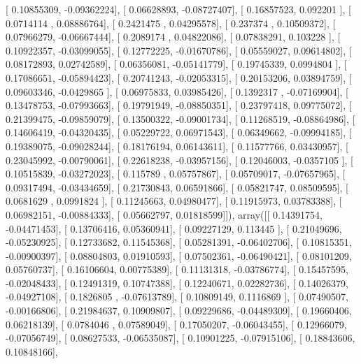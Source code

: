 \documentclass{article}
\begin{document}
       [ 0.10855309, -0.09362224],
       [ 0.06628893, -0.08727407],
       [ 0.16857523,  0.092201  ],
       [ 0.0714114 ,  0.08886764],
       [ 0.2421475 ,  0.04295578],
       [ 0.237374  ,  0.10509372],
       [ 0.07966279, -0.06667444],
       [ 0.2089174 ,  0.04822086],
       [ 0.07838291,  0.103228  ],
       [ 0.10922357, -0.03099055],
       [ 0.12772225, -0.01670786],
       [ 0.05559027,  0.09614802],
       [ 0.08172893,  0.02742589],
       [ 0.06356081, -0.05141779],
       [ 0.19745339,  0.0994804 ],
       [ 0.17086651, -0.05894423],
       [ 0.20741243, -0.02053315],
       [ 0.20153206,  0.03894759],
       [ 0.09603346, -0.0429865 ],
       [ 0.06975833,  0.03985426],
       [ 0.1392317 , -0.07169904],
       [ 0.13478753, -0.07993663],
       [ 0.19791949, -0.08850351],
       [ 0.23797418,  0.09775072],
       [ 0.21399475, -0.09859079],
       [ 0.13500322, -0.09001734],
       [ 0.11268519, -0.08864986],
       [ 0.14606419, -0.04320435],
       [ 0.05229722,  0.06971543],
       [ 0.06349662, -0.09994185],
       [ 0.19389075, -0.09028244],
       [ 0.18176194,  0.06143611],
       [ 0.11577766,  0.03430957],
       [ 0.23045992, -0.00790061],
       [ 0.22618238, -0.03957156],
       [ 0.12046003, -0.0357105 ],
       [ 0.10515839, -0.03272023],
       [ 0.115789  ,  0.05757867],
       [ 0.05709017, -0.07657965],
       [ 0.09317494, -0.03434659],
       [ 0.21730843,  0.06591866],
       [ 0.05821747,  0.08509595],
       [ 0.0681629 ,  0.0991824 ],
       [ 0.11245663,  0.04980477],
       [ 0.11915973,  0.03783388],
       [ 0.06982151, -0.00884333],
       [ 0.05662797,  0.01818599]]), array([[ 0.14391754, -0.04471453],
       [ 0.13706416,  0.05360941],
       [ 0.09227129,  0.113445  ],
       [ 0.21049696, -0.05230925],
       [ 0.12733682,  0.11545368],
       [ 0.05281391, -0.06402706],
       [ 0.10815351, -0.00900397],
       [ 0.08804803,  0.01910593],
       [ 0.07502361, -0.06490421],
       [ 0.08101209,  0.05760737],
       [ 0.16106604,  0.00775389],
       [ 0.11131318, -0.03786774],
       [ 0.15457595, -0.02048433],
       [ 0.12491319,  0.10747388],
       [ 0.12240671,  0.02282736],
       [ 0.14026379, -0.04927108],
       [ 0.1826805 , -0.07613789],
       [ 0.10809149,  0.1116869 ],
       [ 0.07490507, -0.00166806],
       [ 0.21984637,  0.10909807],
       [ 0.09229686, -0.04489309],
       [ 0.19660406,  0.06218139],
       [ 0.0784046 ,  0.07589049],
       [ 0.17050207, -0.06043455],
       [ 0.12966079, -0.07056749],
       [ 0.08627533, -0.06535087],
       [ 0.10901225, -0.07915106],
       [ 0.18843606,  0.10848166],
\end{document}
